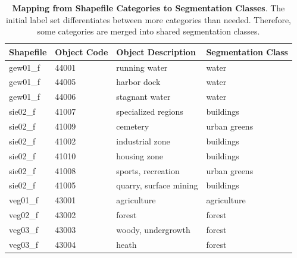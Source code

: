 \begin{table}[]
\centering
\small
\caption[Mapping from Shapefile Categories to Segmentation Classes]
{\textbf{Mapping from Shapefile Categories to Segmentation Classes}. The initial label set differentiates between more categories than needed. Therefore, some categories are merged into shared segmentation classes.}
\label{tab:category_mapping}
\begin{tabular}{|l|l|l|l|}
\hline
\textbf{Shapefile} & \textbf{Object Code} & \textbf{Object Description}    & \textbf{Segmentation Class} \\ \hline
gew01\_f           & 44001                & running water                  & water                          \\ \hline
gew01\_f           & 44005                & harbor dock                    & water                          \\ \hline
gew01\_f           & 44006                & stagnant water                 & water                          \\ \hline
sie02\_f           & 41007                & specialized regions            & buildings                      \\ \hline
sie02\_f           & 41009                & cemetery                       & urban greens                   \\ \hline
sie02\_f           & 41002                & industrial zone                & buildings                      \\ \hline
sie02\_f           & 41010                & housing zone                   & buildings                      \\ \hline
sie02\_f           & 41008                & sports, recreation          & urban greens                   \\ \hline
sie02\_f           & 41005                & quarry, surface mining         & buildings                      \\ \hline
veg01\_f           & 43001                & agriculture                    & agriculture                    \\ \hline
veg02\_f           & 43002                & forest                         & forest                         \\ \hline
veg03\_f           & 43003                & woody, undergrowth             & forest                         \\ \hline
veg03\_f           & 43004                & heath                          & forest                         \\ \hline

\end{tabular}
\end{table}
